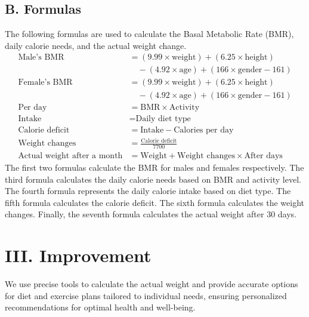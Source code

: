 \documentclass[a4paper,12pt]{article}
\begin{document}
\subsection*{B. Formulas}
The following formulas are used to calculate the Basal Metabolic Rate (BMR), daily calorie needs, and the actual weight change.
\begin{align*}
    \text{Male's BMR} &= (9.99 \times \text{weight}) + (6.25 \times \text{height}) \\
    &\quad - (4.92 \times \text{age}) + (166 \times \text{gender} - 161) \\
    \text{Female's BMR} &= (9.99 \times \text{weight}) + (6.25 \times \text{height}) \\
    &\quad - (4.92 \times \text{age}) + (166 \times \text{gender} - 161) \\
    \text{Per day} &= \text{BMR} \times \text{Activity} \\
    \text{Intake} &= \text{Daily diet type} \\
    \text{Calorie deficit} &= \text{Intake} - \text{Calories per day} \\
    \text{Weight changes} &= \frac{\text{Calorie deficit}}{7700} \\
    \text{Actual weight after a month} &= \text{Weight} + \text{Weight changes} \times \text{After days}
\end{align*}
\noindent
The first two formulas calculate the BMR for males and females respectively. The third formula calculates the daily calorie needs based on BMR and activity level. The fourth formula represents the daily calorie intake based on diet type. The fifth formula calculates the calorie deficit. The sixth formula calculates the weight changes. Finally, the seventh formula calculates the actual weight after 30 days.
\section*{III. Improvement}
\noindent
We use precise tools to calculate the actual weight and provide accurate options for diet and exercise plans tailored to individual needs, ensuring personalized recommendations for optimal health and well-being.
\end{document}
